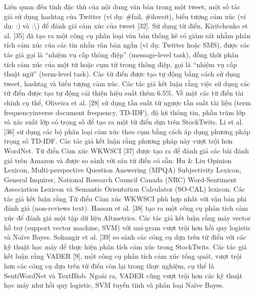 Liên quan đến tính đặc thù của nội dung văn bản trong một tweet, một số tác giả sử dụng hashtag của Twitter (ví dụ: \#fail, \#iloveit), biểu tượng cảm xúc (ví dụ: :) và :\textbackslash) để đánh giá cảm xúc của tweet [32]. Sử dụng từ điển, Kiritchenko et al. [35] đã tạo ra một công cụ phân loại văn bản thống kê có giám sát nhằm phân tích cảm xúc của các tin nhắn văn bản ngắn (ví dụ: Twitter hoặc SMS), được các tác giả gọi là ``nhiệm vụ cấp thông điệp'' (message-level task), đồng thời phân tích cảm xúc của một từ hoặc cụm từ trong thông điệp, gọi là ``nhiệm vụ cấp thuật ngữ'' (term-level task). Các từ điển được tạo tự động bằng cách sử dụng tweet, hashtag và biểu tượng cảm xúc. Các tác giả kết luận rằng việc sử dụng các từ điển được tạo tự động cải thiện hiệu suất thêm 6.5\%. Về mặt các từ điển tài chính cụ thể, Oliveira et al. [28] sử dụng tần suất từ ngược tần suất tài liệu (term frequency\textendash inverse document frequency, TD-IDF), độ lợi thông tin, phần trăm lớp và xác suất lớp có trọng số để tạo ra một từ điển dựa trên StockTwits. Li et al. [36] sử dụng các bộ phân loại cảm xúc theo cụm bằng cách áp dụng phương pháp trọng số TD-IDF. Các tác giả kết luận rằng phương pháp này vượt trội hơn WordNet. Từ điển Cảm xúc WKWSCI [37] được tạo ra để đánh giá các bài đánh giá trên Amazon và được so sánh với sáu từ điển có sẵn: Hu \& Liu Opinion Lexicon, Multi-perspective Question Answering (MPQA) Subjectivity Lexicon, General Inquirer, National Research Council Canada (NRC) Word-Sentiment Association Lexicon và Semantic Orientation Calculator (SO-CAL) lexicon. Các tác giả kết luận rằng Từ điển Cảm xúc WKWSCI phù hợp nhất với văn bản phi đánh giá (non-reviews text). Hassan et al. [38] tạo ra một công cụ phân tích cảm xúc để đánh giá một tập dữ liệu Altmetrics. Các tác giả kết luận rằng máy vector hỗ trợ (support vector machine, SVM) với uni-gram vượt trội hơn hồi quy logistic và Naïve Bayes. Sohangir et al. [39] so sánh các công cụ dựa trên từ điển với các kỹ thuật học máy để thực hiện phân tích cảm xúc trong StockTwits. Các tác giả kết luận rằng VADER [9], một công cụ phân tích cảm xúc tổng quát, vượt trội hơn các công cụ dựa trên từ điển còn lại trong thực nghiệm, cụ thể là SentiWordNet và TextBlob. Ngoài ra, VADER cũng vượt trội hơn các kỹ thuật học máy như hồi quy logistic, SVM tuyến tính và phân loại Naïve Bayes.

